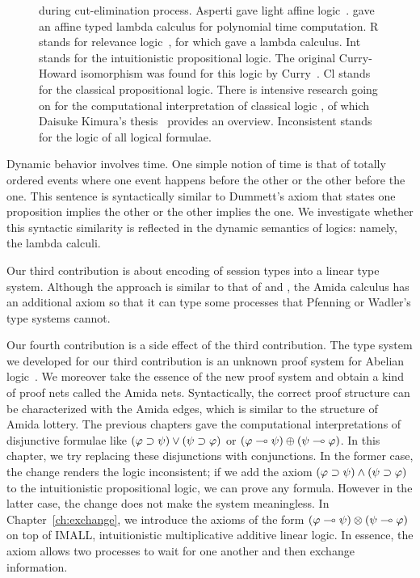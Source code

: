 \begin{figure}
{{  during cut-elimination process.
  Asperti gave light affine logic~\citep{asperti2002}.
  \citet{terui2007} gave an affine typed lambda calculus for polynomial
  time computation.
  \textsf{R} stands for relevance logic~\citep{urquhart1972},
  for which \citet{gabbay1992} gave a lambda calculus.
  \textsf{Int} stands for the intuitionistic propositional logic.
  The original Curry-Howard isomorphism was found for this logic by
  Curry~\citep{curry1942}.
  \textsf{Cl} stands for the classical propositional logic.
  There is intensive research going on for the computational
  interpretation of classical logic
  \citep{lambdamu,filinski1989,griffin1990,ong-stewart,selinger2001,kakutani2002,curien2000,wadler-dual,
  wadler-reloaded}, of which
  Daisuke Kimura's thesis~\cite{kimura} provides an overview.
  \textsf{Inconsistent} stands for the logic of all logical formulae.}
  }
  \label{fig:lattice}
 \end{figure}
Dynamic behavior involves time.
One simple notion of time is that of totally ordered events where
one event happens before the other or the other before the one.
This sentence is syntactically similar to Dummett's axiom that states
one proposition implies the other or the other implies the one.
We investigate whether this syntactic similarity is reflected
in the dynamic semantics of logics: namely, the lambda calculi.

Our third contribution is about encoding of session types into a linear
type system.  Although the approach is similar to that of \citet{pfenning2010} and
\citet{wadler2012propositions}, the Amida calculus has an
additional axiom so that it can type some processes that Pfenning or
Wadler's type systems cannot.

Our fourth contribution is a side effect of the third contribution.
The type system we developed for our third contribution is an
unknown proof system for Abelian logic~\citep{casari1989}.
We moreover take the essence of the new proof system and obtain a kind
of proof nets called the Amida nets.
Syntactically, the correct proof structure can be characterized with
the Amida edges, which is similar to the structure of Amida lottery.
The previous chapters gave the computational interpretations of
disjunctive formulae like $(\varphi\supset\psi)\lor(\psi\supset\varphi)$ or
$(\varphi\multimap\psi)\oplus(\psi\multimap\varphi)$.  In this chapter, we try
replacing these disjunctions with conjunctions.
In the former case, the change renders the logic inconsistent;
if we add the axiom $(\varphi\supset\psi)\land(\psi\supset\varphi)$ to the
intuitionistic propositional logic,
we can prove any formula.  However in the latter case, the change does
not make the system meaningless.
In Chapter~\ref{ch:exchange}, we introduce
the axioms of the form $(\varphi\multimap\psi)\otimes(\psi\multimap\varphi)$
on top of IMALL, intuitionistic
multiplicative additive linear
logic.  In essence, the axiom allows two processes to wait for one
another and then exchange information.

